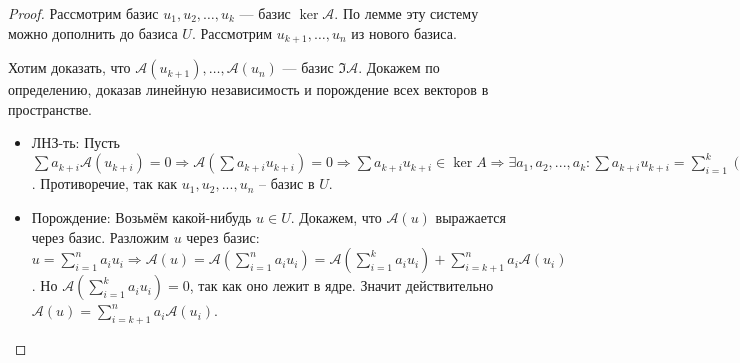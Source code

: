 \begin{proof}
    Рассмотрим базис $u_1, u_2, \ldots, u_k$ --- базис $\ker \mathcal{A}$. По лемме эту систему можно дополнить до базиса  $U$. Рассмотрим $u_{k+1}, \ldots, u_n$ из нового базиса.

    Хотим доказать, что $\mathcal{A}(u_{k+1}), \ldots, \mathcal{A}(u_n)$ --- базис $\Im \mathcal{A}$. Докажем по определению, доказав линейную независимость и порождение всех векторов в пространстве.

    \begin{itemize}
        \item ЛНЗ-ть: Пусть  $\sum a_{k + i} \mathcal{A}(u_{k+i}) = 0 \Rightarrow \mathcal{A}(\sum a_{k+i} u_{k+i}) = 0 \Rightarrow \sum a_{k+i} u_{k+i} \in \ker A \Rightarrow \exists a_1, a_2, ..., a_k : \sum a_{k + i} u_{k + i} = \sum\limits_{i=1}^k (-a_i) u_i \Rightarrow \sum\limits_{i=1}^n a_i u_i = 0$. Противоречие, так как $u_1, u_2, ..., u_n$ -- базис в $U$.
        \item Порождение: Возьмём какой-нибудь $u \in U$. Докажем, что $\mathcal{A}(u)$ выражается через базис. Разложим $u$ через базис: $u = \sum\limits_{i = 1}^n a_i u_i \Rightarrow \mathcal{A}(u) = \mathcal{A}\left(\sum\limits_{i = 1}^n a_i u_i\right) = \mathcal{A}\left(\sum\limits_{i=1}^k a_i u_i\right) + \sum\limits_{i=k+1}^n a_i \mathcal{A}(u_i)$. Но $\mathcal{A}\left(\sum\limits_{i=1}^k a_i u_i\right) = 0$, так как оно лежит в ядре. Значит действительно $\mathcal{A}(u) = \sum\limits_{i=k+1}^n a_i \mathcal{A}(u_i)$.
    \end{itemize}
\end{proof}

